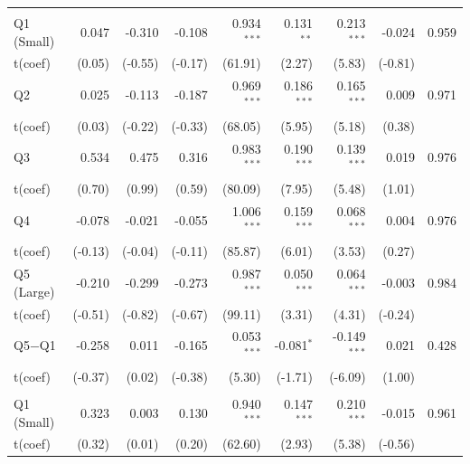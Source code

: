 \begin{table}[!htbp]
{\begin{tabular*}{\linewidth}{@{\extracolsep{\fill}}lrrrrrrrr}
\midrule
\addlinespace[0.3em]
\multicolumn{9}{l}{Active --- EW}\\
\hspace{1em}Q1 (Small) & 0.047 & -0.310 & -0.108 & 0.934$^{***}$ & 0.131$^{**}$ & 0.213$^{***}$ & -0.024 & 0.959\\
\hspace{1em}t(coef) & (0.05) & (-0.55) & (-0.17) & (61.91) & (2.27) & (5.83) & (-0.81) & \\
\hspace{1em}Q2 & 0.025 & -0.113 & -0.187 & 0.969$^{***}$ & 0.186$^{***}$ & 0.165$^{***}$ & 0.009 & 0.971\\
\hspace{1em}t(coef) & (0.03) & (-0.22) & (-0.33) & (68.05) & (5.95) & (5.18) & (0.38) & \\
\hspace{1em}Q3 & 0.534 & 0.475 & 0.316 & 0.983$^{***}$ & 0.190$^{***}$ & 0.139$^{***}$ & 0.019 & 0.976\\
\hspace{1em}t(coef) & (0.70) & (0.99) & (0.59) & (80.09) & (7.95) & (5.48) & (1.01) & \\
\hspace{1em}Q4 & -0.078 & -0.021 & -0.055 & 1.006$^{***}$ & 0.159$^{***}$ & 0.068$^{***}$ & 0.004 & 0.976\\
\hspace{1em}t(coef) & (-0.13) & (-0.04) & (-0.11) & (85.87) & (6.01) & (3.53) & (0.27) & \\
\hspace{1em}Q5 (Large) & -0.210 & -0.299 & -0.273 & 0.987$^{***}$ & 0.050$^{***}$ & 0.064$^{***}$ & -0.003 & 0.984\\
\hspace{1em}t(coef) & (-0.51) & (-0.82) & (-0.67) & (99.11) & (3.31) & (4.31) & (-0.24) & \\
\hspace{1em}Q5$-$Q1 & -0.258 & 0.011 & -0.165 & 0.053$^{***}$ & -0.081$^{*}$ & -0.149$^{***}$ & 0.021 & 0.428\\
\hspace{1em}t(coef) & (-0.37) & (0.02) & (-0.38) & (5.30) & (-1.71) & (-6.09) & (1.00) & \\
\addlinespace[0.3em]
\hline
\multicolumn{9}{l}{Active --- VW}\\
\hspace{1em}Q1 (Small) & 0.323 & 0.003 & 0.130 & 0.940$^{***}$ & 0.147$^{***}$ & 0.210$^{***}$ & -0.015 & 0.961\\
\hspace{1em}t(coef) & (0.32) & (0.01) & (0.20) & (62.60) & (2.93) & (5.38) & (-0.56) & \\

\end{tabular*}}
\end{table}

